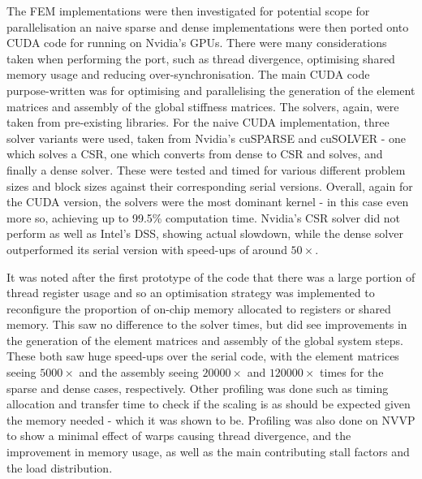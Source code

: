 The FEM implementations were then investigated for potential scope for parallelisation an naive sparse and dense implementations were then ported onto CUDA code for running on Nvidia's GPUs. There were many considerations taken when performing the port, such as thread divergence, optimising shared memory usage and reducing over-synchronisation. The main CUDA code purpose-written was for optimising and parallelising the generation of the element matrices and assembly of the global stiffness matrices. The solvers, again, were taken from pre-existing libraries. For the naive CUDA implementation, three solver variants were used, taken from Nvidia's cuSPARSE and cuSOLVER - one which solves a CSR, one which converts from dense to CSR and solves, and finally a dense solver. These were tested and timed for various different problem sizes and block sizes against their corresponding serial versions. Overall, again for the CUDA version, the solvers were the most dominant kernel - in this case even more so, achieving up to 99.5\% computation time. Nvidia's CSR solver did not perform as well as Intel's DSS, showing actual slowdown, while the dense solver outperformed its serial version with speed-ups of around $50\times$. 

It was noted after the first prototype of the code that there was a large portion of thread register usage and so an optimisation strategy was implemented to reconfigure the proportion of on-chip memory allocated to registers or shared memory. This saw no difference to the solver times, but did see improvements in the generation of the element matrices and assembly of the global system steps. These both saw huge speed-ups over the serial code, with the element matrices seeing $5000\times$ and the assembly seeing $20000\times$ and $120000\times$ times for the sparse and dense cases, respectively. Other profiling was done such as timing allocation and transfer time to check if the scaling is as should be expected given the memory needed - which it was shown to be. Profiling was also done on NVVP to show a minimal effect of warps causing thread divergence, and the improvement in memory usage, as well as the main contributing stall factors and the load distribution.

